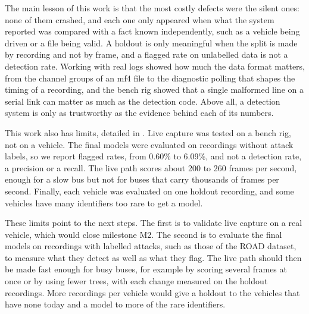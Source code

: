 The main lesson of this work is that the most costly defects were the silent ones: none of them crashed, and each one only appeared when what the system reported was compared with a fact known independently, such as a vehicle being driven or a file being valid. A holdout is only meaningful when the split is made by recording and not by frame, and a flagged rate on unlabelled data is not a detection rate. Working with real logs showed how much the data format matters, from the channel groups of an \gls{mf4} file to the diagnostic polling that shapes the timing of a recording, and the bench rig showed that a single malformed line on a serial link can matter as much as the detection code. Above all, a detection system is only as trustworthy as the evidence behind each of its numbers.

This work also has limits, detailed in . Live capture was tested on a bench rig, not on a vehicle. The final models were evaluated on recordings without attack labels, so we report flagged rates, from 0.60\% to 6.09\%, and not a detection rate, a precision or a recall. The live path scores about 200 to 260 frames per second, enough for a slow bus but not for buses that carry thousands of frames per second. Finally, each vehicle was evaluated on one holdout recording, and some vehicles have many identifiers too rare to get a model.

These limits point to the next steps. The first is to validate live capture on a real vehicle, which would close milestone M2. The second is to evaluate the final models on recordings with labelled attacks, such as those of the ROAD dataset, to measure what they detect as well as what they flag. The live path should then be made fast enough for busy buses, for example by scoring several frames at once or by using fewer trees, with each change measured on the holdout recordings. More recordings per vehicle would give a holdout to the vehicles that have none today and a model to more of the rare identifiers.

\cleardoublepage
